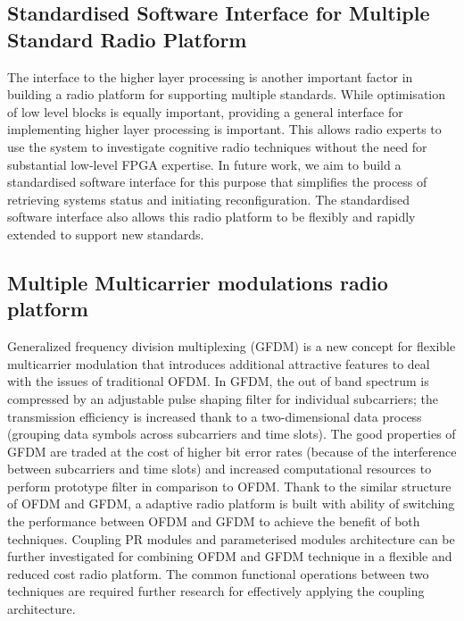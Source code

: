 \subsection{Standardised Software Interface for Multiple Standard Radio Platform}
The interface to the higher layer processing is another important factor in building a radio platform for supporting multiple standards.
While optimisation of low level blocks is equally important, providing a general interface for implementing higher layer processing is important.
This allows radio experts to use the system to investigate cognitive radio techniques without the need for substantial low-level FPGA expertise.
In future work, we aim to build a standardised software interface for this purpose that simplifies the process of retrieving systems status and initiating reconfiguration.
The standardised software interface also allows this radio platform to be flexibly and rapidly extended to support new standards.

\subsection{Multiple Multicarrier modulations radio platform}
Generalized frequency division multiplexing (GFDM) is a new concept for flexible multicarrier modulation that introduces additional attractive features to deal with the issues of traditional OFDM. 
In GFDM, the out of band spectrum is compressed by an adjustable pulse shaping filter for individual subcarriers; the transmission efficiency is increased thank to a two-dimensional data process (grouping data symbols across subcarriers and time slots). 
The good properties of GFDM are traded at the cost of higher bit error rates (because of the interference between subcarriers and time slots) and increased computational resources to perform prototype filter in comparison to OFDM. 
Thank to the similar structure of OFDM and GFDM, a adaptive radio platform is built with ability of switching the performance between OFDM and GFDM to achieve the benefit of both techniques.
Coupling PR modules and parameterised modules architecture can be further investigated for combining OFDM and GFDM technique in a flexible and reduced cost radio platform.
The common functional operations between two techniques are required further research for effectively applying the coupling architecture.  


